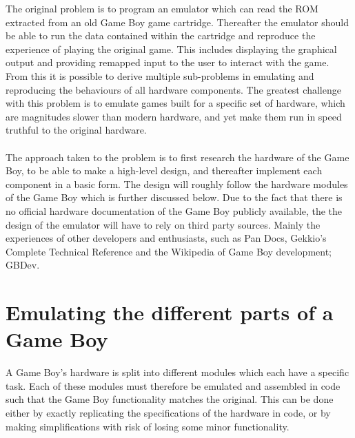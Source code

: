 The original problem is to program an emulator which can read the ROM extracted from an old Game Boy game cartridge. Thereafter the emulator should be able to run the data contained within the cartridge and reproduce the experience of playing the original game. This includes displaying the graphical output and providing remapped input to the user to interact with the game. From this it is possible to derive multiple sub-problems in emulating and reproducing the behaviours of all hardware components. The greatest challenge with this problem is to emulate games built for a specific set of hardware, which are magnitudes slower than modern hardware, and yet make them run in speed truthful to the original hardware.
\\\\
The approach taken to the problem is to first research the hardware of the Game Boy, to be able to make a high-level design, and thereafter implement each component in a basic form. The design will roughly follow the hardware modules of the Game Boy which is further discussed below. Due to the fact that there is no official hardware documentation of the Game Boy publicly available, the the design of the emulator will have to rely on third party sources. Mainly the experiences of other developers and enthusiasts, such as Pan Docs\cite{pandocs}, Gekkio's Complete Technical Reference\cite{CompleteTechnicalReference} and the Wikipedia of Game Boy development; GBDev\cite{GBDev}.


\section{Emulating the different parts of a Game Boy}
A Game Boy's hardware is split into different modules which each have a specific task. Each of these modules must therefore be emulated and assembled in code such that the Game Boy functionality matches the original. This can be done either by exactly replicating the specifications of the hardware in code, or by making simplifications with risk of losing some minor functionality. 
    
